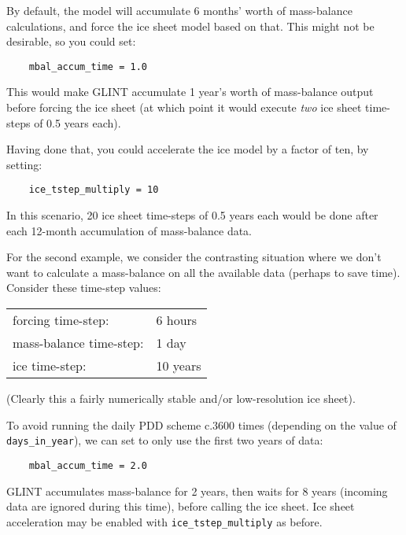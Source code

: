 By default, the model will accumulate 6 months' worth of mass-balance 
calculations, and force the ice sheet model based on that. This might not be 
desirable, so you could set:

\begin{verbatim}
    mbal_accum_time = 1.0
\end{verbatim}

This would make GLINT accumulate 1 year's worth of mass-balance output before 
forcing the ice sheet (at which point it would execute \emph{two} ice sheet 
time-steps of 0.5 years each).

Having done that, you could accelerate the ice model by a factor of ten, by 
setting:

\begin{verbatim}
    ice_tstep_multiply = 10
\end{verbatim}

In this scenario, 20 ice sheet time-steps of 0.5 years each would be done 
after each 12-month accumulation of mass-balance data.

For the second example, we consider the contrasting situation where we don't want to calculate a 
mass-balance on all the available data (perhaps to save time). Consider 
these time-step values:

\vspace{0.5cm}
\begin{tabular}{ll}
forcing time-step:   &   6 hours \\
mass-balance time-step: & 1 day \\
ice time-step:       &   10 years
\end{tabular}
\vspace{0.5cm}

(Clearly this a fairly numerically stable and/or low-resolution ice sheet).

To avoid running the daily PDD scheme c.3600 times (depending on the value of 
\texttt{days\_in\_year}), we can set to only use the first two years of data:

\begin{verbatim}
    mbal_accum_time = 2.0
\end{verbatim}

GLINT accumulates mass-balance for 2 years, then waits for 8 years (incoming 
data are ignored during this time), before calling the ice sheet. Ice sheet 
acceleration may be enabled with \texttt{ice\_tstep\_multiply} as before.

%


